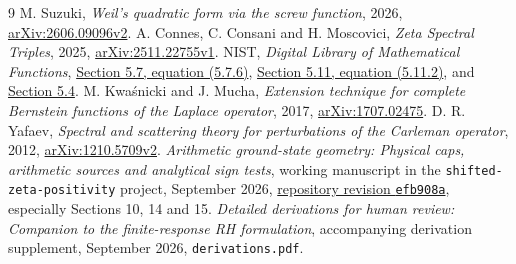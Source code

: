 \begin{thebibliography}{9}
 M. Suzuki, \emph{Weil's quadratic form via the screw function},
2026, \href{https://arxiv.org/abs/2606.09096v2}{arXiv:2606.09096v2}.
 A. Connes, C. Consani and H. Moscovici,
\emph{Zeta Spectral Triples}, 2025,
\href{https://arxiv.org/abs/2511.22755v1}{arXiv:2511.22755v1}.
 NIST, \emph{Digital Library of Mathematical Functions},
\href{https://dlmf.nist.gov/5.7.E6}{Section 5.7, equation (5.7.6)},
\href{https://dlmf.nist.gov/5.11.E2}{Section 5.11, equation (5.11.2)}, and
\href{https://dlmf.nist.gov/5.4}{Section 5.4}.
 M. Kwa\'snicki and J. Mucha, \emph{Extension technique for complete
Bernstein functions of the Laplace operator}, 2017,
\href{https://arxiv.org/abs/1707.02475}{arXiv:1707.02475}.
 D. R. Yafaev, \emph{Spectral and scattering theory for perturbations
of the Carleman operator}, 2012,
\href{https://arxiv.org/abs/1210.5709v2}{arXiv:1210.5709v2}.
 \emph{Arithmetic ground-state geometry: Physical caps,
arithmetic sources and analytical sign tests}, working manuscript in the
\texttt{shifted-zeta-positivity} project, September 2026,
\href{https://github.com/ebbaker/shifted-zeta-positivity/tree/efb908ab32245eba55c0c751f3b4a33b7306e6b7/papers/susy-positivity/investigations/arithmetic-ground-state-geometry}{repository revision \texttt{efb908a}}, especially Sections 10, 14 and 15.
\ifdefined\MainManuscript
{} \emph{Detailed derivations for human review:
Companion to the finite-response RH formulation}, accompanying derivation
supplement, September 2026, \texttt{derivations.pdf}.
\fi
\end{thebibliography}
